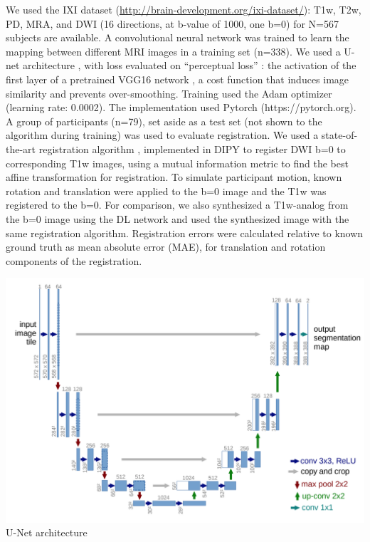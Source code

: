 \documentclass[a0, landscape]{a0poster}
\begin{document}
\begin{multicols}{3}
We used the IXI dataset (\url{http://brain-development.org/ixi-dataset/}): T1w, T2w, PD, MRA, and DWI (16 directions, at b-value of 1000, one b=0) for N=567 subjects are available. A convolutional neural network was trained to learn the mapping between different MRI images in a training set (n=338).  We used a U-net architecture \cite{Ronneberger2015-ua}, with loss evaluated on “perceptual loss” \cite{Johnson2016-ac}: the activation of the first layer of a pretrained VGG16 network \cite{Simonyan2014-ua}, a  cost function that induces image similarity and prevents over-smoothing. Training used the Adam optimizer (learning rate: 0.0002). The implementation used Pytorch (https://pytorch.org).
A group of participants (n=79), set aside as a test set (not shown to the algorithm during training) was used to evaluate registration. We used a state-of-the-art registration algorithm \cite{Avants2008-sa}, implemented in DIPY \cite{Garyfallidis2014-el} to register DWI b=0 to corresponding T1w images, using a mutual information metric to find the best affine transformation for registration. To simulate participant motion, known rotation and translation were applied to the b=0 image and the T1w was registered to the b=0. For comparison, we also synthesized a T1w-analog from the b=0 image using the DL network and used the synthesized image with the same registration algorithm. Registration errors were calculated relative to known ground truth as mean absolute error (MAE), for translation and rotation components of the registration.

\begin{minipage}[b]{\linewidth}
\includegraphics[width=\linewidth]{unet.png}
\center U-Net architecture
\end{minipage}
\\
\columnbreak


\end{multicols}
\end{document}
